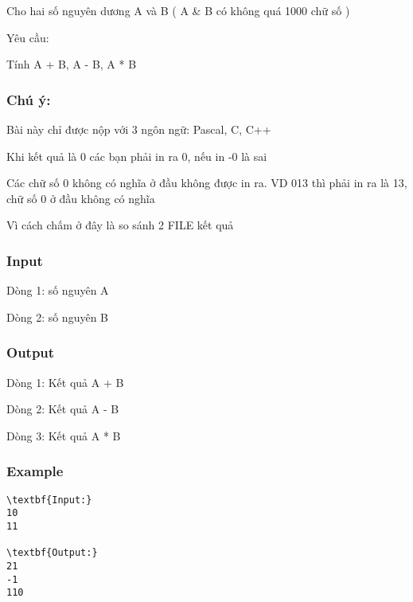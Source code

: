 



   Cho hai số nguyên dương A và B ( A \& B có không quá 1000 chữ số )  

   Yêu cầu:  

   Tính A + B, A - B, A * B  

\subsubsection{   Chú ý:  }

   Bài này chỉ được nộp với 3 ngôn ngữ: Pascal, C, C++  

   Khi kết quả là 0 các bạn phải in ra 0, nếu in -0 là sai  

   Các chữ số 0 không có nghĩa ở đầu không được in ra. VD 013 thì phải in ra là 13, chữ số 0 ở đầu không có nghĩa  

   Vì cách chấm ở đây là so sánh 2 FILE kết quả  

\subsubsection{   Input  }

   Dòng 1: số nguyên A  

   Dòng 2: số nguyên B  

\subsubsection{   Output  }

   Dòng 1: Kết quả A + B  

   Dòng 2: Kết quả A - B  

   Dòng 3: Kết quả A * B  

\subsubsection{   Example  }
\begin{verbatim}
\textbf{Input:}
10
11

\textbf{Output:}
21
-1
110
\end{verbatim}